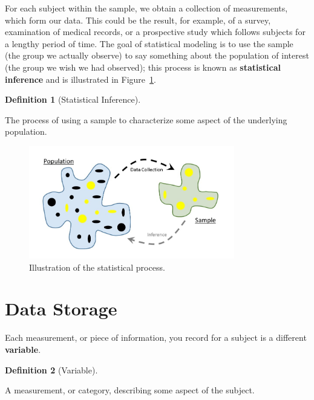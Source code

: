 \documentclass[
  letterpaper,
  DIV=11,
  numbers=noendperiod]{scrreprt}
\theoremstyle{definition}
\newtheorem{definition}{Definition}[chapter]
\theoremstyle{definition}
\theoremstyle{remark}
\begin{document}
For each subject within the sample, we obtain a collection of
measurements, which form our data. This could be the result, for
example, of a survey, examination of medical records, or a prospective
study which follows subjects for a lengthy period of time. The goal of
statistical modeling is to use the sample (the group we actually
observe) to say something about the population of interest (the group we
wish we had observed); this process is known as \textbf{statistical
inference} and is illustrated in
Figure~\ref{fig-statistical-process-statistical-process}.

\begin{definition}[Statistical
Inference]\protect\hypertarget{def-inference}{}\label{def-inference}

The process of using a sample to characterize some aspect of the
underlying population.

\end{definition}

\begin{figure}

{\centering \includegraphics[width=0.8\textwidth,height=\textheight]{images/Statistical-Process-Statistical-Process.jpg}

}

\caption{\label{fig-statistical-process-statistical-process}Illustration
of the statistical process.}

\end{figure}

\hypertarget{data-storage}{%
\section{Data Storage}\label{data-storage}}

Each measurement, or piece of information, you record for a subject is a
different \textbf{variable}.

\begin{definition}[Variable]\protect\hypertarget{def-variable}{}\label{def-variable}

A measurement, or category, describing some aspect of the subject.

\end{definition}
\end{document}
